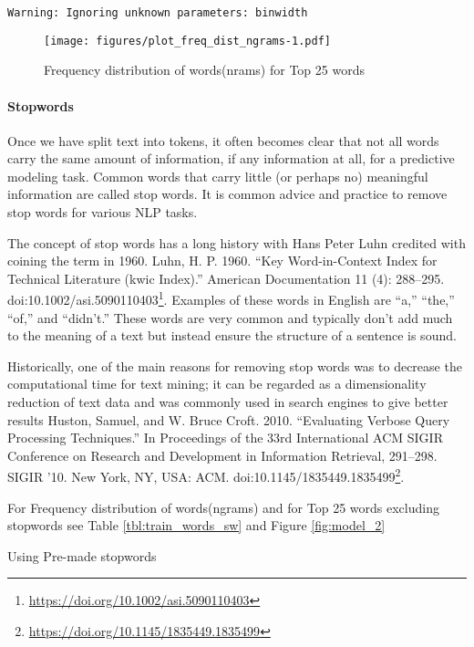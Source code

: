 \documentclass[
]{article}
\DeclareRobustCommand{\href}[2]{#2\footnote{\url{#1}}}
\begin{document}
\begin{verbatim}
Warning: Ignoring unknown parameters: binwidth
\end{verbatim}

\begin{figure}
\centering
\texttt{[image: figures/plot\_freq\_dist\_ngrams-1.pdf]}
\caption{Frequency distribution of words(nrams) for Top 25
words\label{fig:model_1}}
\end{figure}

\newpage

\hypertarget{stopwords}{%
\paragraph{Stopwords}\label{stopwords}}

Once we have split text into tokens, it often becomes clear that not all
words carry the same amount of information, if any information at all,
for a predictive modeling task. Common words that carry little (or
perhaps no) meaningful information are called stop words. It is common
advice and practice to remove stop words for various NLP tasks.

The concept of stop words has a long history with Hans Peter Luhn
credited with coining the term in 1960.
\href{https://doi.org/10.1002/asi.5090110403}{Luhn, H. P. 1960. ``Key
Word-in-Context Index for Technical Literature (kwic Index).'' American
Documentation 11 (4): 288--295. doi:10.1002/asi.5090110403}. Examples of
these words in English are ``a,'' ``the,'' ``of,'' and ``didn't.'' These
words are very common and typically don't add much to the meaning of a
text but instead ensure the structure of a sentence is sound.

Historically, one of the main reasons for removing stop words was to
decrease the computational time for text mining; it can be regarded as a
dimensionality reduction of text data and was commonly used in search
engines to give better results
\href{https://doi.org/10.1145/1835449.1835499}{Huston, Samuel, and W.
Bruce Croft. 2010. ``Evaluating Verbose Query Processing Techniques.''
In Proceedings of the 33rd International ACM SIGIR Conference on
Research and Development in Information Retrieval, 291--298. SIGIR '10.
New York, NY, USA: ACM. doi:10.1145/1835449.1835499}.

For Frequency distribution of words(ngrams) and for Top 25 words
excluding stopwords see Table \ref{tbl:train_words_sw} and Figure
\ref{fig:model_2}

Using Pre-made stopwords
\end{document}
